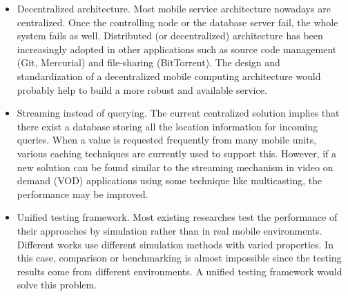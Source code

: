 \documentclass[12pt,a4paper]{article}
\begin{document}
\begin{itemize}
	\item Decentralized architecture. Most mobile service architecture nowadays are centralized. Once the controlling node or the database server fail, the whole system fails as well. Distributed (or decentralized) architecture has been increasingly adopted in other applications such as source code management (Git, Mercurial) and file-sharing (BitTorrent). The design and standardization of a decentralized mobile computing architecture would probably help to build a more robust and available service.
	\item Streaming instead of querying. The current centralized solution implies that there exist a database storing all the location information for incoming queries. When a value is requested frequently from many mobile units, various caching techniques are currently used to support this. However, if a new solution can be found similar to the streaming mechanism in video on demand (VOD) applications using some technique like multicasting, the performance may be improved.
	\item Unified testing framework. Most existing researches test the performance of their approaches by simulation rather than in real mobile environments. Different works use different simulation methods with varied properties. In this case, comparison or benchmarking is almost impossible since the testing results come from different environments. A unified testing framework would solve this problem.
\end{itemize}




\end{document}

